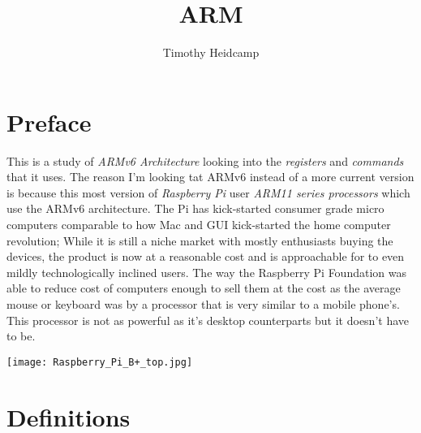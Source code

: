 \documentclass[twoside]{article}
\date{}
\begin{document}
	\title{ARM}
	\author{Timothy Heidcamp}
	
	\maketitle
	
	\section{Preface}
		
		This is a study of \textit{ARMv6 Architecture} looking into the \textit{registers} and \textit{commands} that it uses.  
		The reason I'm looking tat ARMv6 instead of a more current version is because this most version of \textit{Raspberry Pi} user \textit{ARM11 series processors} which use the ARMv6 architecture. The Pi has kick-started consumer grade micro computers comparable to how Mac and GUI kick-started the home computer revolution; While it is still a niche market with mostly enthusiasts buying the devices, the product is now at a reasonable cost and is approachable for to even mildly technologically inclined users. The way the Raspberry Pi Foundation was able to reduce cost of computers enough to sell them at the cost as the average mouse or keyboard was by a processor that is very similar to a mobile phone's. This processor is not as powerful as it's desktop counterparts but it doesn't have to be.
	
		\texttt{[image: Raspberry\_Pi\_B+\_top.jpg]}
	
		\pagebreak

	\section{Definitions}
	
\end{document}

